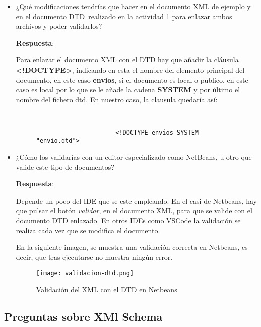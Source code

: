 \begin{itemize}
    \item ¿Qué modificaciones tendrías que hacer en el documento XML de ejemplo y en el documento DTD realizado en la actividad 1 para enlazar ambos archivos y poder validarlos?

    \textbf{Respuesta}:

    Para enlazar el documento XML con el DTD hay que añadir la cláusula \textbf{<!DOCTYPE>}, indicando en esta el nombre del elemento principal del documento, en este caso \textbf{envios}, si el documento es local o publico, en este caso es local por lo que se le añade la cadena \textbf{SYSTEM} y por último el nombre del fichero dtd. En nuestro caso, la clausula quedaría así:

    \begin{figure}[h]
        \begin{tcolorbox}[sharp corners, colback=yellow!30, colframe=white!20]
            \scriptsize
            \begin{verbatim}


                      <!DOCTYPE envios SYSTEM "envio.dtd">
            \end{verbatim}
        \end{tcolorbox}
    \end{figure}

    \item ¿Cómo los validarías con un editor especializado como NetBeans, u otro que valide este tipo de documentos?

    \textbf{Respuesta}:

    Depende un poco del IDE que se este empleando. En el casi de Netbeans, hay que pulsar el botón \textit{validar}, en el documento XML, para que se valide con el documento DTD enlazado. En otros IDEs como VSCode la validación se realiza cada vez que se modifica el documento.

    En la siguiente imagen, se muestra una validación correcta en Netbeans, es decir, que tras ejecutarse no muestra ningún error.

    \begin{figure}[H]
        \centering
        \texttt{[image: validacion-dtd.png]}
        \caption{Validación del XML con el DTD en Netbeans}
    \end{figure}
\end{itemize}

\subsection{Preguntas sobre XMl Schema}

